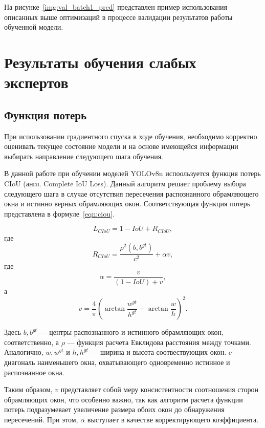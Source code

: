 На рисунке~\ref{img:val_batch1_pred} представлен пример использования описанных выше оптимизаций в процессе валидации результатов работы обученной модели.


\section{Результаты обучения слабых экспертов}

\subsection{Функция потерь}

При использовании градиентного спуска в ходе обучения, необходимо корректно оценивать текущее состояние модели и на основе имеющейся информации выбирать направление следующего шага обучения.

В данной работе при обучении моделей YOLOv8n испоользуется функция потерь CIoU (англ. Complete IoU Loss). Данный алгоритм решает проблему выбора следующего шага в случае отсутствия пересечения распознанного обрамляющего окна и истинно верных обрамляющих окон. Соответствующая функция потерь представлена в формуле~\ref{eqn:ciou}.

\begin{equation} \label{eqn:ciou}
    L_{CIoU} = 1 - IoU + R_{CIoU},
\end{equation}
где
\begin{equation}
    R_{CIoU} = \frac{\rho^2(b,b^{gt})}{c^2} + \alpha v,
\end{equation}
где
\begin{equation}
    \alpha = \frac{v}{(1 - IoU) + v},
\end{equation}
а
\begin{equation}
    v = \frac{4}{\pi}(\arctan{\frac{w^{gt}}{h^{gt}}} - \arctan{\frac{w}{h}})^2.
\end{equation}

Здесь $b, b^{gt}$ --- центры распознанного и истинного обрамляющих окон, соответственно, а $\rho$ --- функция расчета Евклидова расстояния между точками. Аналогично, $w,w^{gt}$ и $h,h^{gt}$ --- ширина и высота соотвествующих окон. $c$ --- диагональ наименьшего окна, охватывающего одновременно истинное и распознанное окна.

Таким образом, $v$ представляет собой меру консистентности соотношения сторон обрамляющих окон, что особенно важно, так как алгоритм расчета функции потерь подразумевает увеличение размера обоих окон до обнаружения пересечений. При этом, $\alpha$ выступает в качестве корректирующего коэффициента.

